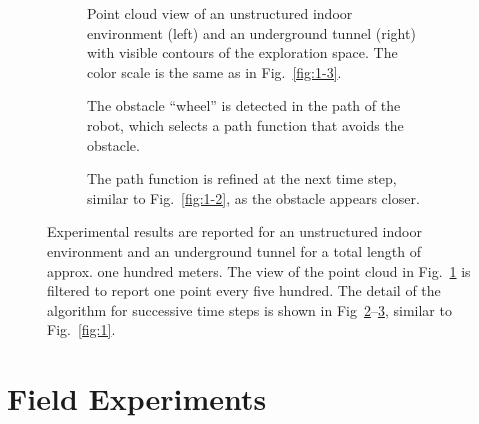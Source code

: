 \documentclass[lettersize,journal]{IEEEtran}
\theoremstyle{definition}
\begin{document}
\begin{figure*}[t]
  \begin{subfigure}[m]{0.48\textwidth}
    \centering
    \hspace*{-1.2cm}
    
    \caption{Point cloud view of an unstructured indoor environment (left) and an underground tunnel (right) with visible contours of the exploration space. The color scale is the same as in Fig.~\ref{fig:1-3}.}
    \label{fig:2-1}
  \end{subfigure}
  \hfill
  \begin{subfigure}[m]{0.25\textwidth}
    \centering
    
    \caption{The obstacle ``wheel'' is detected in the path of the robot, which selects a path function that avoids the obstacle.}
    \vspace*{-1cm}
    \label{fig:2-2}
  \end{subfigure}
  \hfill
  \begin{subfigure}[m]{0.25\textwidth}
    \centering
    
    \caption{The path function is refined at the next time step, similar to Fig.~\ref{fig:1-2}, as the obstacle appears closer.}
    \vspace*{-1cm}
    \label{fig:2-3}
  \end{subfigure}
  \caption{Experimental results are reported for an unstructured indoor environment and an underground tunnel for a total length of approx. one hundred meters. The view of the point cloud in Fig.~\ref{fig:2-1} is filtered to report one point every five hundred. The detail of the algorithm for successive time steps is shown in Fig~\ref{fig:2-2}--\ref{fig:2-3}, similar to Fig.~\ref{fig:1}.}
  \label{fig:2}
\end{figure*}


\section{Field Experiments}
\label{sec:fe}
\end{document}
